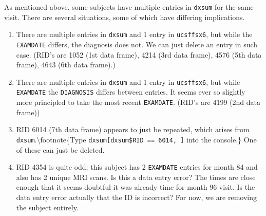 \documentclass[
]{article}
\newenvironment{Shaded}{\begin{snugshade}}{\end{snugshade}}
\newcommand{\CommentTok}[1]{\textcolor[rgb]{0.56,0.35,0.01}{\textit{#1}}}
\newcommand{\DataTypeTok}[1]{\textcolor[rgb]{0.13,0.29,0.53}{#1}}
\newcommand{\KeywordTok}[1]{\textcolor[rgb]{0.13,0.29,0.53}{\textbf{#1}}}
\newcommand{\NormalTok}[1]{#1}
\newcommand{\OperatorTok}[1]{\textcolor[rgb]{0.81,0.36,0.00}{\textbf{#1}}}
\newcommand{\StringTok}[1]{\textcolor[rgb]{0.31,0.60,0.02}{#1}}
\begin{document}
\begin{Shaded}
\end{Shaded}

As mentioned above, some subjects have multiple entries in
\texttt{dxsum} for the same visit. There are several situations, some of
which have differing implications.

\begin{enumerate}
\def\labelenumi{(\arabic{enumi})}
\item
  There are multiple entries in \texttt{dxsum} and 1 entry in
  \texttt{ucsffsx6}, but while the \texttt{EXAMDATE} differs, the
  diagnosis does not. We can just delete an entry in such case. (RID's
  are 1052 (1st data frame), 4214 (3rd data frame), 4576 (5th data
  frame), 4643 (6th data frame).)
\item
  There are multiple entries in \texttt{dxsum} and 1 entry in
  \texttt{ucsffsx6}, but while \texttt{EXAMDATE} the \texttt{DIAGNOSIS}
  differs between entries. It seems ever so slightly more principled to
  take the most recent \texttt{EXAMDATE}. (RID's are 4199 (2nd data
  frame))
\item
  RID 6014 (7th data frame) appears to just be repeated, which arises
  from \texttt{dxsum}.\textbackslash footnote\{Type
  \texttt{dxsum{[}dxsum\$RID\ ==\ 6014,\ {]}} into the console.\} One of
  these can just be deleted.
\item
  RID 4354 is quite odd; this subject has 2 \texttt{EXAMDATE} entries
  for month 84 and also has 2 unique MRI scans. Is this a data entry
  error? The times are close enough that it seems doubtful it was
  already time for month 96 visit. Is the data entry error actually that
  the ID is incorrect? For now, we are removing the subject entirely.
\end{enumerate}
\end{document}
